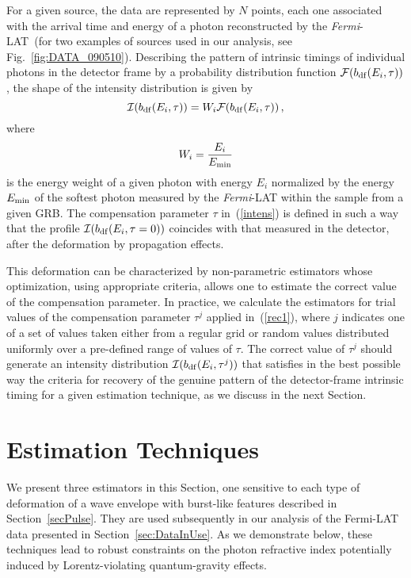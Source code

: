 \documentclass[12pt]{article}
\newcommand{\beq}{\begin{equation}}
\newcommand{\eeq}{\end{equation}}
\newcommand{\lat}{{\it Fermi}-LAT}
\begin{document}
For a given source, the data are represented
by $N$ points, each one associated with the arrival time and energy of a photon reconstructed by the
\lat~(for two examples of sources used in our analysis, see Fig.~\ref{fig:DATA_090510}).
Describing the pattern of intrinsic timings of individual photons in the detector frame
by a probability distribution function ${\cal F}(b_{\rm df}(E_i,\tau ))$,
the shape of the intensity distribution is given by
\beq
{\cal I}(b_{\rm df}(E_i,\tau )) = W_i{\cal F}(b_{\rm df}(E_i,\tau )) \, ,
\label{intens}
\eeq
where
\beq
\label{weight}
W_i=\frac{E_i}{E_{\rm min}}
\eeq
is the energy weight of a given photon with energy $E_i$ normalized
by the energy $E_{\rm min}$ of the softest photon measured by the {\it Fermi}-LAT within the
sample from a given GRB. The compensation parameter $\tau $ in~(\ref{intens}) is
defined in such a way that the profile ${\cal I}(b_{\rm df}(E_i,\tau  = 0))$ coincides with that measured in the
detector, after the deformation by propagation effects.

This deformation can be characterized by non-parametric estimators whose optimization, using
appropriate criteria, allows one to estimate the correct value of the
compensation parameter.
In practice, we calculate the estimators for trial values
of the compensation parameter $\tau ^j$ applied in~(\ref{rec1}), where $j$ indicates one of a set of
values taken either from a regular grid or random values distributed uniformly over a
pre-defined range of values of $\tau $.
The correct value of $\tau ^j$ should generate an intensity distribution ${\cal I}(b_{\rm df}(E_i,\tau ^j))$ that
satisfies in the best possible way the criteria for recovery of the genuine pattern of the detector-frame intrinsic timing
for a given estimation technique, as we discuss in the next Section.




\section{Estimation Techniques \label{sec:estim}}

We present three estimators in this Section, one sensitive to each type of deformation
of a wave envelope with burst-like features described in Section~\ref{secPulse}. They are used subsequently in our analysis of the Fermi-LAT
data presented in Section~\ref{sec:DataInUse}. As we demonstrate below, these techniques lead to robust constraints on the
photon refractive index potentially induced by Lorentz-violating quantum-gravity effects.
\end{document}
